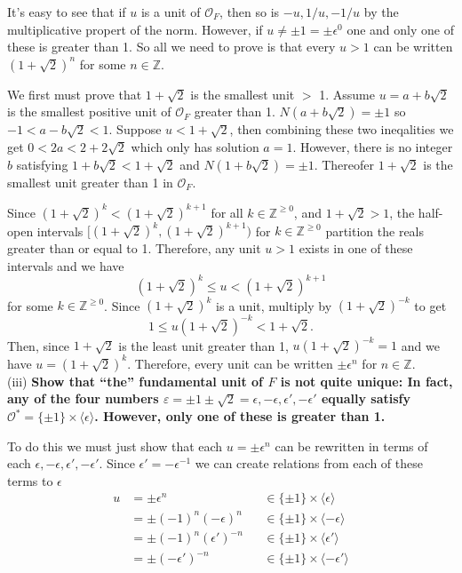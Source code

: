 \documentclass[12pt]{amsart}
\theoremstyle{definition}
\theoremstyle{remark}
\begin{document}

It's easy to see that if $u$ is a unit of $\mathcal{O}_F$, then so is $-u,1/u,-1/u$ by the multiplicative propert of the norm. However, if $u \not = \pm 1 = \pm \epsilon^0$ one and only one of these is greater than 1. So all we need to prove is that every $u>1$ can be written $(1+\sqrt{2})^n$ for some $n\in\mathbb{Z}$.

We first must prove that $1+\sqrt{2}$ is the smallest unit $>$ 1. Assume $u=a+b\sqrt{2}$ is the smallest positive unit of $\mathcal{O}_F$ greater than 1. $N(a+b\sqrt{2})= \pm1$ so $-1 < a-b\sqrt{2} < 1$. Suppose $u < 1 + \sqrt{2}$, then combining these two ineqalities we get $0 < 2a < 2 + 2\sqrt{2}$ which only has solution $a = 1$. However, there is no integer $b$ satisfying $1 + b\sqrt{2} < 1 + \sqrt{2}$ and $N(1 + b\sqrt{2}) = \pm 1$. Thereofer $1 + \sqrt{2}$ is the smallest unit greater than 1 in $\mathcal{O}_F$. 

Since $(1+\sqrt{2})^k < (1+\sqrt{2})^{k+1}$ for all $k\in\mathbb{Z}^{\geq0}$, and $1+\sqrt{2}>1$, the half-open intervals $[(1+\sqrt{2})^k,(1+\sqrt{2})^{k+1})$ for $k\in\mathbb{Z}^{\geq0}$ partition the reals greater than or equal to 1. Therefore, any unit $u>1$ exists in one of these intervals and we have $$(1+\sqrt{2})^k \leq u < (1+\sqrt{2})^{k+1}$$ for some $k\in\mathbb{Z}^{\geq0}$. Since $(1+\sqrt{2})^k$ is a unit, multiply by $(1+\sqrt{2})^{-k}$ to get $$1 \leq u(1+\sqrt{2})^{-k} < 1+\sqrt{2}.$$ Then, since $1+\sqrt{2}$ is the least unit greater than 1, $u(1+\sqrt{2})^{-k} = 1$ and we have $u = (1+\sqrt{2})^k$. Therefore, every unit can be written $\pm \epsilon^n$ for $n\in\mathbb{Z}$.\\

\qquad(iii) \textbf{Show that “the” fundamental unit of $F$ is not quite unique: In fact, any of the four numbers
$\varepsilon = \pm 1 \pm \sqrt{2} = \epsilon, -\epsilon, \epsilon',-\epsilon'$ equally satisfy $\mathcal{O}^* = \{\pm 1\} \times \langle \epsilon \rangle$. However, only one of these is greater than 1.}

To do this we must just show that each $u = \pm \epsilon^n$ can be rewritten in terms of each $\epsilon, -\epsilon,\epsilon', -\epsilon'$. Since $\epsilon' = -\epsilon^{-1}$ we can create relations from each of these terms to $\epsilon$
\begin{align*}
    u &= \pm \epsilon^n &&\in \{\pm1\}\times\langle \epsilon\rangle\\
    &= \pm (-1)^n(-\epsilon)^n &&\in \{\pm1\}\times\langle -\epsilon\rangle\\
    &= \pm (-1)^n(\epsilon')^{-n} &&\in \{\pm1\}\times\langle \epsilon'\rangle\\
    &= \pm (-\epsilon')^{-n} &&\in \{\pm1\}\times\langle -\epsilon'\rangle
\end{align*}
\end{document}
